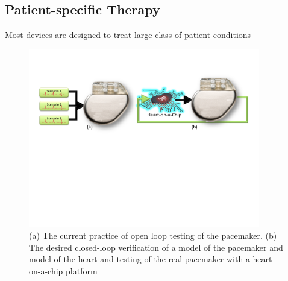 \subsection{Patient-specific Therapy}
Most devices are designed to treat large class of patient conditions


\begin{figure}[b]
		\centering
		\includegraphics[width=0.9\textwidth]{figs/closedloop.pdf}
		\caption{\small (a) The current practice of open loop testing of the pacemaker. (b) The desired closed-loop verification of a model of the pacemaker and model of the heart and testing of the real pacemaker with a heart-on-a-chip platform}
		\label{fig:closedloop}
\end{figure}


